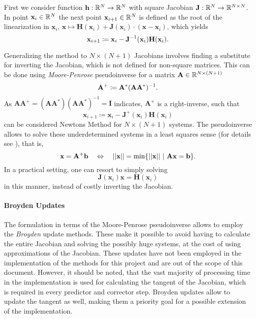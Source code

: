 First we consider function $\mathbf h: \mathbb{R}^N \to \mathbb{R}^N$ with square Jacobian $\mathbf J: \mathbb{R}^N \to \mathbb{R}^{N \times N}$.
In point $\mathbf x_i \in \mathbb{R}^N$ the next point $\mathbf x_{i+1} \in \mathbb{R}^N$ is defined as the root of the linearization in $\mathbf x_i$, $\mathbf x \mapsto \mathbf H(\mathbf x_i) + \mathbf J(\mathbf x_i) \cdot (\mathbf x - \mathbf x_i)$, which yields
	\[
		\mathbf x_{i+1} \coloneqq \mathbf x_i - \mathbf J^{-1}(\mathbf x_i) \mathbf H(\mathbf x_i) \text.
	\]

Generalizing the method to $N \times (N+1)$ Jacobians involves finding a substitute for inverting the Jacobian, which is not defined for non-square matrices.
This can be done using \emph{Moore-Penrose} pseudoinverse for a matrix $\mathbf A \in \mathbb{R}^{N \times (N+1)}$
	\[
		\mathbf A^+ \coloneqq \mathbf A^*(\mathbf A \mathbf A^*)^{-1} \text.
	\]
As $\mathbf A \mathbf A^+ = (\mathbf A \mathbf A^*)(\mathbf A \mathbf A^*)^{-1} = \mathbf I$ indicates, $\mathbf A^+$ is a right-inverse, such that
	\[
		\mathbf x_{i+1} \coloneqq \mathbf x_i - \mathbf J^+(\mathbf x_i) \mathbf H(\mathbf x_i)
	\]
can be considered Newtons Method for $N\times (N+1)$ systems.
The pseudoinverse allows to solve these underdetermined systems in a least squares sense (for details see \cite{allgower1990numerical}), that is,
	\[
		\mathbf x = \mathbf A^+ \mathbf b \quad \Leftrightarrow \quad \mathbf ||\mathbf x|| = \min \{ ||\mathbf x||\ |\ \mathbf A \mathbf x = \mathbf b\} \text.
	\]
In a practical setting, one can resort to simply solving
	\[
		\mathbf J(\mathbf x_i) \mathbf x = \mathbf H(\mathbf x_i)
	\]
in this manner, instead of costly inverting the Jacobian.

\paragraph{Broyden Updates} The formulation in terms of the Moore-Penrose pseudoinverse allows to employ the \emph{Broyden} update methods.
These make it possible to avoid having to calculate the entire Jacobian and solving the possibly huge systems, at the cost of using approximations of the Jacobian.
These updates have not been employed in the implementation of the methods for this project and are out of the scope of this document.
However, it should be noted, that the vast majority of processing time in the implementation is used for calculating the tangent of the Jacobian, which is required in every predictor and corrector step.
Broyden updates allow to update the tangent as well, making them a priority goal for a possible extension of the implementation.



